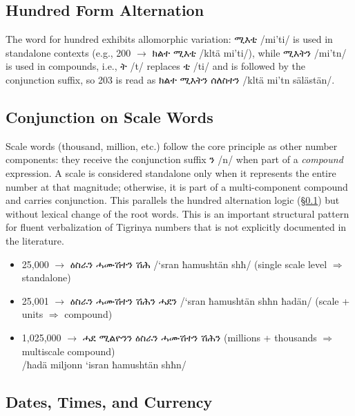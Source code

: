 \documentclass{article}
\newcommand{\ti}[1]{{\geezfont #1}}
\newcommand{\tib}[1]{{\geezfontbold #1}}
\newcommand{\tiipa}[2]{{\geezfont #1} /#2/}
\begin{document}
\vspace{-1.2em}
\subsection{Hundred Form Alternation}
\label{sec:hundred_form}

The word for hundred exhibits allomorphic variation: \tiipa{ሚእቲ}{mi'ti} is used in standalone contexts (e.g., 200 $\rightarrow$ \tiipa{ክልተ ሚእቲ}{kltä mi'ti}), while \ti{ሚእ}\tib{ት}\ti{ን}\tiipa{}{mi'tn} is used in compounds, i.e., \tiipa{ት}{t} replaces \tiipa{ቲ}{ti} and is followed by the conjunction suffix, so 203 is read as \tiipa{ክልተ ሚእትን ሰለስተን}{kltä mi'tn sälästän}.

\subsection{Conjunction on Scale Words}
\label{sec:scale_conjunction}

Scale words (thousand, million, etc.) follow the core principle as other number components: they receive the conjunction suffix \tiipa{ን}{n} when part of a \emph{compound} expression. A scale is considered standalone only when it represents the entire number at that magnitude; otherwise, it is part of a multi-component compound and carries conjunction.
This parallels the hundred alternation logic (\S\ref{sec:hundred_form}) but without lexical change of the root words. This is an important structural pattern for fluent verbalization of Tigrinya numbers that is not explicitly documented in the literature.

\vspace{-0.9em}
\begin{itemize}
 \item 25,000 $\rightarrow$ \tiipa{ዕስራን ሓሙሽተን ሽሕ}{`sran ħamushtän shħ} \hfill (single scale level $\Rightarrow$ standalone)
 \item 25,001 $\rightarrow$ \ti{ዕስራን ሓሙሽተን ሽሕ}\tib{ን}\ti{ ሓደ}\tib{ን}\tiipa{}{`sran ħamushtän shħn ħadän} \hfill (scale + units $\Rightarrow$ compound)
 \item 1,025,000 $\rightarrow$ \ti{ሓደ ሚልዮን}\tib{ን} \ti{ዕስራን ሓሙሽተን ሽሕ}\tib{ን} \hfill (millions + thousands $\Rightarrow$ multiscale compound) \\
\hspace*{1.9cm}\tiipa{}{ħadä miljonn `isran ħamushtän shħn}
\end{itemize}

\subsection{Dates, Times, and Currency}
\end{document}
